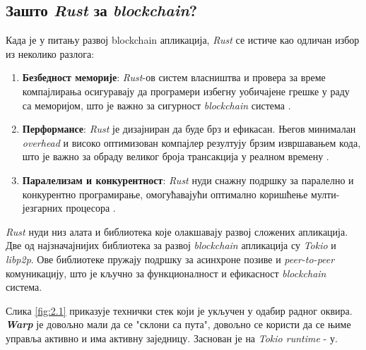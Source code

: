 \documentclass[12pt, a4paper]{article}
\begin{document}
\subsection{Зашто \textit{Rust} за \textit{blockchain}?}
Када је у питању развој blockchain апликација, \textit{Rust} се истиче као одличан избор из неколико разлога:
\begin{enumerate}
    \item \textbf{Безбедност меморије}: \textit{Rust}-ов систем власништва и провера за време компајлирања осигуравају да програмери избегну уобичајене грешке у раду са меморијом, што је важно за сигурност \textit{blockchain} система \cite{7}.
    \item \textbf{Перформансе}: \textit{Rust} је дизајниран да буде брз и ефикасан. Његов минималан \textit{overhead} и високо оптимизован компајлер резултују брзим извршавањем кода, што је важно за обраду великог броја трансакција у реалном времену \cite{7}.
    \item \textbf{Паралелизам и конкурентност}: \textit{Rust} нуди снажну подршку за паралелно и конкурентно програмирање, омогућавајући оптимално коришћење мулти-језгарних процесора \cite{7}.
\end{enumerate}

\textit{Rust} нуди низ алата и библиотека које олакшавају развој сложених апликација. Две од најзначајнијих библиотека за развој \textit{blockchain} апликација су \textit{Tokio} и \textit{libp2p}. Ове библиотеке пружају подршку за асинхроне позиве и \textit{peer-to-peer} комуникацију, што је кључно за функционалност и ефикасност \textit{blockchain} система.

\pagebreak


Слика \ref{fig:2.1} приказује технички стек који је укључен у одабир радног оквира. \textbf{\textit{Warp}} је довољно мали да се "склони са пута", довољно се користи да се њиме управља активно и има активну заједницу. Заснован је на \textit{Tokio runtime} - у. 
\end{document}
